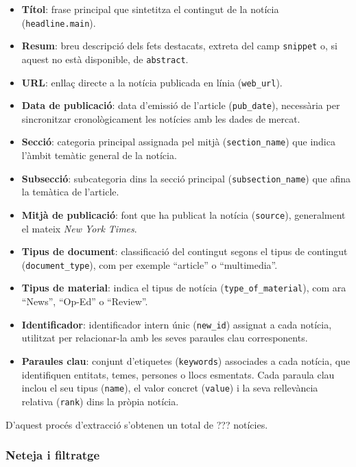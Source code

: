 \documentclass[12pt,a4paper,twoside]{book}
\begin{document}
\begin{itemize}
    \item \textbf{Títol}: frase principal que sintetitza el contingut de la notícia (\texttt{headline.main}).
    \item \textbf{Resum}: breu descripció dels fets destacats, extreta del camp \texttt{snippet} o, si aquest no està disponible, de \texttt{abstract}.
    \item \textbf{URL}: enllaç directe a la notícia publicada en línia (\texttt{web\_url}).
    \item \textbf{Data de publicació}: data d'emissió de l'article (\texttt{pub\_date}), necessària per sincronitzar cronològicament les notícies amb les dades de mercat.
    \item \textbf{Secció}: categoria principal assignada pel mitjà (\texttt{section\_name}) que indica l'àmbit temàtic general de la notícia.
    \item \textbf{Subsecció}: subcategoria dins la secció principal (\texttt{subsection\_name}) que afina la temàtica de l'article.
    \item \textbf{Mitjà de publicació}: font que ha publicat la notícia (\texttt{source}), generalment el mateix \textit{New York Times}.
    \item \textbf{Tipus de document}: classificació del contingut segons el tipus de contingut (\texttt{document\_type}), com per exemple “article” o “multimedia”.
    \item \textbf{Tipus de material}: indica el tipus de notícia (\texttt{type\_of\_material}), com ara “News”, “Op-Ed” o “Review”.
    \item \textbf{Identificador}: identificador intern únic (\texttt{new\_id}) assignat a cada notícia, utilitzat per relacionar-la amb les seves paraules clau corresponents.
    \item \textbf{Paraules clau}: conjunt d'etiquetes (\texttt{keywords}) associades a cada notícia, que identifiquen entitats, temes, persones o llocs esmentats. Cada paraula clau inclou el seu tipus (\texttt{name}), el valor concret (\texttt{value}) i la seva rellevància relativa (\texttt{rank}) dins la pròpia notícia.
\end{itemize}

D'aquest procés d'extracció s'obtenen un total de ??? notícies.


\subsubsection*{Neteja i filtratge}
\end{document}
